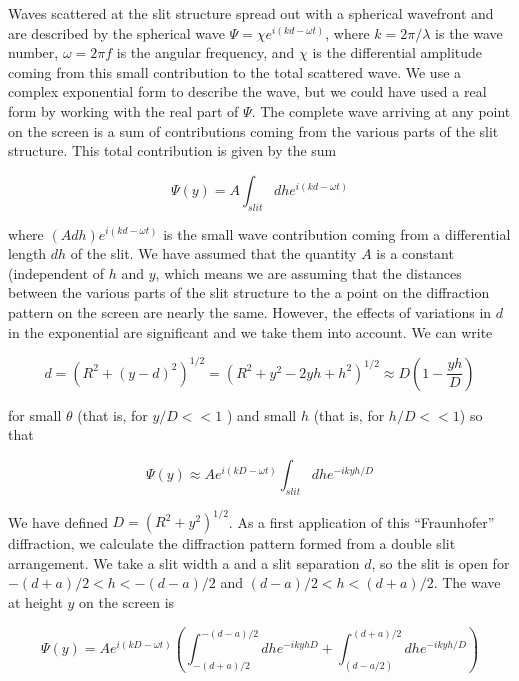 \documentclass[11pt]{article}
\begin{document}
\vspace{3mm}

Waves scattered at the slit structure spread out with a spherical wavefront and
are described by the spherical wave $\Psi = \chi e^{i(kd-\omega t)}$, where $k =
2\pi/\lambda$ is the wave number, $\omega = 2\pi f$ is the angular frequency,
and $\chi$ is the differential amplitude coming from this small contribution to
the total scattered wave. We use a complex exponential form to describe the
wave, but we could have used a real form by working with the real part of
$\Psi$. The complete wave arriving at any point on the screen is a sum of
contributions coming from the various parts of the slit structure. This total
contribution is given by the sum

\begin{equation}
  \Psi(y) = A\int_{slit}dh e^{i(kd-\omega t)}
\end{equation}

\noindent where $(Adh)e^{i(kd-\omega t)}$ is the small wave contribution coming
from a differential length $dh$ of the slit. We have assumed that the quantity
$A$ is a constant (independent of $h$ and $y$, which means we are assuming that
the distances between the various parts of the slit structure to the a point on
the diffraction pattern on the screen are nearly the same. However, the effects
of variations in $d$ in the exponential are significant and we take them into
account. We can write

\begin{equation}
  d = \left( R^2+(y-d)^2 \right)^{1/2} = \left( R^2+y^2-2yh+h^2
  \right)^{1/2} \approx D\left( 1-\frac{yh}{D} \right)
\end{equation}

\noindent for small $\theta$ (that is, for $y/D << 1$ ) and small $h$ (that is, for
$h/D<<1$) so that

\begin{equation}
  \Psi(y) \approx Ae^{i(kD-\omega t)} \int_{slit}dh e^{-ikyh/D}
\end{equation}

We have defined $D = (R^2+y^2)^{1/2}$. As a first application of this
``Fraunhofer'' diffraction, we calculate the diffraction pattern formed from a
double slit arrangement. We take a slit width a and a slit separation $d$, so
the slit is open for $-(d+a)/2<h<-(d-a)/2$ and $(d-a)/2<h<(d+a)/2$. The wave at
height $y$ on the screen is

\begin{equation}
  \Psi(y) = Ae^{i(kD-\omega t)}\left( \int_{-(d+a)/2}^{-(d-a)/2}dh e^{-ikyhD} +
  \int_{(d-a/2)}^{(d+a)/2}dh e^{-ikyh/D} \right)
\end{equation}
\end{document}
